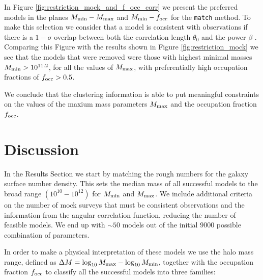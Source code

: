 \documentclass[usenatbib]{mn2e}
\newcommand{\hMsun}{{\ifmmode{h^{-1}{\rm
        {M_{\odot}}}}\else{$h^{-1}{\rm{M_{\odot}}}$}\fi}}
\begin{document}
In Figure \ref{fig:restriction_mock_and_f_occ_corr} we present the preferred
models in the planes $M_{\rm min}-M_{\rm  max}$ and $M_{\rm min}-f_{\rm occ}$
for the {\tt match} method. To make this selection we consider that
a model is consistent with observations if there is a $1-\sigma$
overlap between both the correlation length $\theta_0$ and the power
$\beta$ . Comparing this Figure with the results shown in Figure
\ref{fig:restriction_mock} we see that the models that were removed
were those with highest minimal masses $M_{\rm min}>10^{11.2}$, for
all the values of $M_{\rm max}$, with preferentially high
occupation fractions of $f_{\rm occ}> 0.5$.  

We conclude that the clustering information is able to put meaningful
constraints on the values of the maxium mass parameters $M_{\rm max}$
and the occupation fraction $f_{\rm occ}$. 








\section{Discussion}

In the Results Section we start by matching the rough numbers for the
galaxy surface number density. This sets the median mass of all
successful models to the broad range $(10^{10}-10^{12})$ \hMsun for
$M_{\rm min}$ and $M_{\rm max}$. We include additional criteria on the
number of mock surveys that must be consistent observations
and the information from the angular correlation function, reducing
the number of feasible models. We end up with $\sim 50$ models out of
the initial $9000$ possible combination of parameters. 

In order to make a physical interpretation of these models we use 
the halo mass range, defined as $\Delta M=\log_{10}M_{\rm max} -
\log_{10}M_{\rm  min}$, together with the occupation fraction $f_{\rm
  occ}$ to classify all the successful models into three families:  
\end{document}
